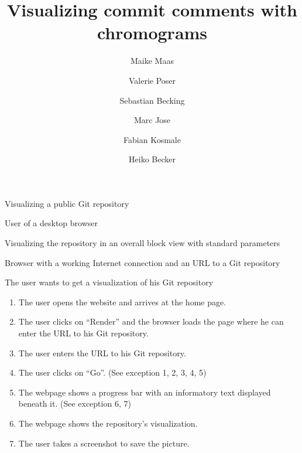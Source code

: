 \documentclass[11pt]{scrartcl}
\author{Maike Maas \and Valerie Poser \and Sebastian Becking \and
        Marc Jose \and Fabian Kosmale \and Heiko Becker}
\title{Visualizing commit comments with chromograms}
\begin{document}
\maketitle

\begin{description}[leftmargin=!,labelwidth=\widthof{\bfseries Frequency of use:}]
	\item[Use-case:] Visualizing a public Git repository 
	\item[Primary actor:] User of a desktop browser 
	\item[Goal in context:] Visualizing the repository in an overall block view with standard parameters 
	\item[Preconditions:] Browser with a working Internet connection and an URL to a Git repository
	\item[Trigger:] The user wants to get a visualization of his Git repository 

	\item[Scenario:]
		\begin{enumerate}[leftmargin=1.5em]
			\item The user opens the website and arrives at the home page.
			\item The user clicks on \enquote{Render} and the browser loads the page where
				he can enter the URL to his Git repository. 
			\item The user enters the URL to his Git repository. 
			\item The user clicks on \enquote{Go}. (See exception 1, 2, 3, 4, 5)
			\item The webpage shows a progress bar with an
				informatory text displayed beneath
				it. (See exception 6, 7)
			\item The webpage shows the repository's visualization.
			\item The user takes a screenshot to save the picture. 
		\end{enumerate}


\end{description}
\end{document}
